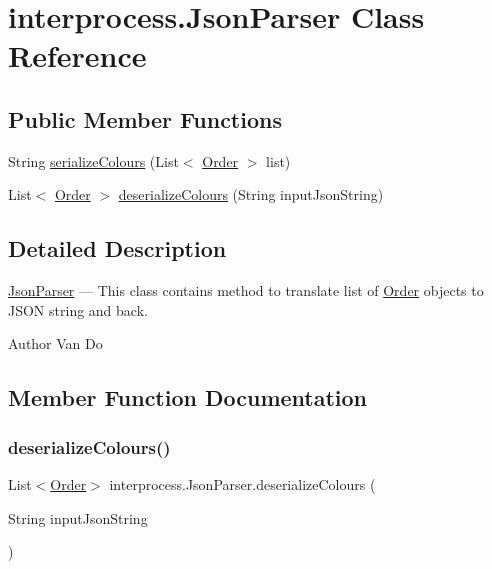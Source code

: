 \hypertarget{classinterprocess_1_1_json_parser}{}\section{interprocess.\+Json\+Parser Class Reference}
\label{classinterprocess_1_1_json_parser}
\subsection*{Public Member Functions}
\begin{DoxyCompactItemize}
\item 
String \hyperlink{classinterprocess_1_1_json_parser_a71acd9266626b51692367dcadab6bdb3}{serialize\+Colours} (List$<$ \hyperlink{classinterprocess_1_1_order}{Order} $>$ list)
\item 
List$<$ \hyperlink{classinterprocess_1_1_order}{Order} $>$ \hyperlink{classinterprocess_1_1_json_parser_aedad98ba21bcb5476a00ac4c66267c57}{deserialize\+Colours} (String input\+Json\+String)
\end{DoxyCompactItemize}


\subsection{Detailed Description}
\hyperlink{classinterprocess_1_1_json_parser}{Json\+Parser} --- This class contains method to translate list of \hyperlink{classinterprocess_1_1_order}{Order} objects to J\+S\+ON string and back. \begin{DoxyAuthor}{Author}
Van Do 
\end{DoxyAuthor}


\subsection{Member Function Documentation}
\mbox{\label{classinterprocess_1_1_json_parser_aedad98ba21bcb5476a00ac4c66267c57}} 
\subsubsection{\texorpdfstring{deserialize\+Colours()}{deserializeColours()}}
{\footnotesize\ttfamily List$<$\hyperlink{classinterprocess_1_1_order}{Order}$>$ interprocess.\+Json\+Parser.\+deserialize\+Colours (\begin{DoxyParamCaption}\item[{String}]{input\+Json\+String }\end{DoxyParamCaption})\hspace{0.3cm}{\ttfamily [inline]}}

